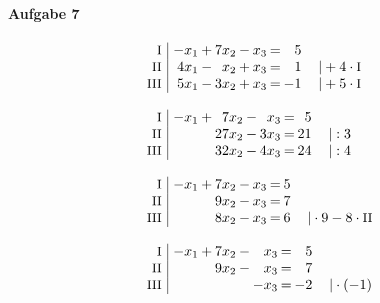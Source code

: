 \paragraph{Aufgabe 7}
\begin{equation*}
\begin{array}{l}
\setlength{\arraycolsep}{1pt}
\begin{array}{r|rcrcrcrl}
    \text{\small I } &\; -x_{1} & + & 7x_{2} & - & x_{3} & = &  5 &                              \\
   \text{\small II } &\; 4x_{1} & - &  x_{2} & + & x_{3} & = &  1 & \quad|+4\cdot\text{\small I} \\
  \text{\small III } &\; 5x_{1} & - & 3x_{2} & + & x_{3} & = & -1 & \quad|+5\cdot\text{\small I}   
\end{array}
\\ \\
\setlength{\arraycolsep}{1pt}
\begin{array}{r|rcrcrcrl}
    \text{\small I } &\; -x_{1} & + &  7x_{2} & - &  x_{3} & = &  5 &          \\
   \text{\small II } &\;        &   & 27x_{2} & - & 3x_{3} & = & 21 & \quad|:3 \\
  \text{\small III } &\;        &   & 32x_{2} & - & 4x_{3} & = & 24 & \quad|:4   
\end{array}
\\ \\
\setlength{\arraycolsep}{1pt}
\begin{array}{r|rcrcrcrl}
    \text{\small I } &\; -x_{1} & + & 7x_{2} & - & x_{3} & = & 5 &                                     \\
   \text{\small II } &\;        &   & 9x_{2} & - & x_{3} & = & 7 &                                     \\
  \text{\small III } &\;        &   & 8x_{2} & - & x_{3} & = & 6 & \quad|\cdot9-8\cdot\text{\small II}   
\end{array}
\\ \\
\setlength{\arraycolsep}{1pt}
\begin{array}{r|rcrcrcrl}
    \text{\small I } &\; -x_{1} & + & 7x_{2} & - &  x_{3} & = &  5 &                 \\
   \text{\small II } &\;        &   & 9x_{2} & - &  x_{3} & = &  7 &                 \\
  \text{\small III } &\;        &   &        &   & -x_{3} & = & -2 & \quad|\cdot(-1)   
\end{array}
\\ \\

\end{array}
\end{equation*}
